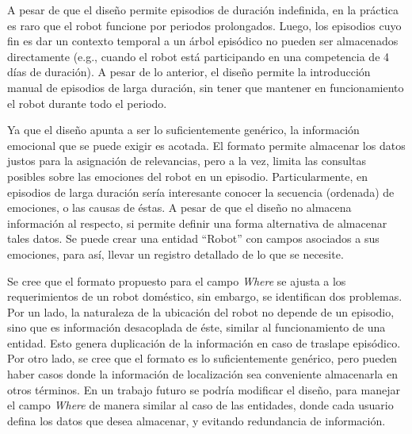 A pesar de que el diseño permite episodios de duración indefinida, en la práctica es raro que el robot funcione por periodos prolongados. Luego, los episodios cuyo fin es dar un contexto temporal a un árbol episódico no pueden ser almacenados directamente (e.g., cuando el robot está participando en una competencia de 4 días de duración). A pesar de lo anterior, el diseño permite la introducción manual de episodios de larga duración, sin tener que mantener en funcionamiento el robot durante todo el periodo.

Ya que el diseño apunta a ser lo suficientemente genérico, la información emocional que se puede exigir es acotada. El formato permite almacenar los datos justos para la asignación de relevancias, pero a la vez, limita las consultas posibles sobre las emociones del robot en un episodio. Particularmente, en episodios de larga duración sería interesante conocer la secuencia (ordenada) de emociones, o las causas de éstas. A pesar de que el diseño no almacena información al respecto, si permite definir una forma alternativa de almacenar tales datos. Se puede crear una entidad ``Robot'' con campos asociados a sus emociones, para así, llevar un registro detallado de lo que se necesite.

Se cree que el formato propuesto para el campo \textit{Where} se ajusta a los requerimientos de un robot doméstico, sin embargo, se identifican dos problemas. Por un lado, la naturaleza de la ubicación del robot no depende de un episodio, sino que es información desacoplada de éste, similar al funcionamiento de una entidad. Esto genera duplicación de la información en caso de traslape episódico. Por otro lado, se cree que el formato es lo suficientemente genérico, pero pueden haber casos donde la información de localización sea conveniente almacenarla en otros términos. En un trabajo futuro se podría modificar el diseño, para manejar el campo \textit{Where}  de manera similar al caso de las entidades, donde cada usuario defina los datos que desea almacenar, y evitando redundancia de información.



